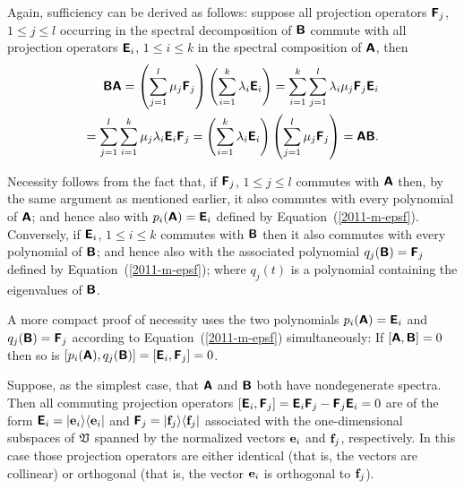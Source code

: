 {\color{OliveGreen}\bproof
Again, sufficiency can be derived as follows: suppose all projection operators $\textsf{\textbf{F}}_j$, $1\le j\le l$
occurring in the spectral decomposition of $\textsf{\textbf{B}}$
commute with all projection operators $\textsf{\textbf{E}}_i$, $1\le i\le k$
in the spectral composition of   $\textsf{\textbf{A}}$,
then
\begin{equation}
\begin{split}
 \textsf{\textbf{B}}\textsf{\textbf{A}}
=
\left(\sum_{j=1}^l \mu_j\textsf{\textbf{F}}_j\right) \left(\sum_{i=1}^k \lambda_i \textsf{\textbf{E}}_i\right)
=
\sum_{i=1}^k \sum_{j=1}^l \lambda_i \mu_j \textsf{\textbf{F}}_j\textsf{\textbf{E}}_i
\\
=
\sum_{j=1}^l \sum_{i=1}^k \mu_j \lambda_i \textsf{\textbf{E}}_i \textsf{\textbf{F}}_j
=
\left(\sum_{i=1}^k \lambda_i \textsf{\textbf{E}}_i \right)  \left(\sum_{j=1}^l \mu_j \textsf{\textbf{F}}_j\right)
=\textsf{\textbf{A}} \textsf{\textbf{B}}
.
\end{split}
\end{equation}


Necessity follows from the fact that, if $\textsf{\textbf{F}}_j$, $1\le j\le l$
commutes with  $\textsf{\textbf{A}}$
then, by the same argument as mentioned earlier,
it also commutes with every polynomial of  $\textsf{\textbf{A}}$;
and
hence also with $p_i(\textsf{\textbf{A}})=\textsf{\textbf{E}}_i$ defined by Equation~(\ref{2011-m-epsf}).
Conversely,
if $\textsf{\textbf{E}}_i$, $1\le i\le k$
commutes with  $\textsf{\textbf{B}}$
then it also commutes with every polynomial of  $\textsf{\textbf{B}}$;
and
hence also with the associated polynomial
$q_j(\textsf{\textbf{B}})=\textsf{\textbf{F}}_j$ defined by Equation~(\ref{2011-m-epsf});
where $q_j(t)$ is a polynomial containing the eigenvalues of $\textsf{\textbf{B}}$.

A more compact proof of necessity uses the two polynomials
$p_i(\textsf{\textbf{A}})=\textsf{\textbf{E}}_i$
and
$q_j(\textsf{\textbf{B}})=\textsf{\textbf{F}}_j$
according to Equation~(\ref{2011-m-epsf})
simultaneously:
If
$[\textsf{\textbf{A}},\textsf{\textbf{B}}] = 0$
then so is
$[p_i(\textsf{\textbf{A}}),q_j(\textsf{\textbf{B}})] = [\textsf{\textbf{E}}_i,\textsf{\textbf{F}}_j]= 0$.
\eproof
}




Suppose, as the simplest case, that $\textsf{\textbf{A}}$ and $\textsf{\textbf{B}}$
both have nondegenerate spectra.
Then all commuting projection operators $\left[
\textsf{\textbf{E}}_{i}
,
\textsf{\textbf{F}}_{j}
\right]=
\textsf{\textbf{E}}_{i}
\textsf{\textbf{F}}_{j}
-
\textsf{\textbf{F}}_{j}
\textsf{\textbf{E}}_{i}
=0$ are of the form
$\textsf{\textbf{E}}_{i} = \vert {\bf e}_i \rangle \langle {\bf e}_i \vert$
and
$\textsf{\textbf{F}}_{j} = \vert {\bf f}_j \rangle \langle {\bf f}_j \vert$
associated with the one-dimensional subspaces of ${\frak V}$
spanned by the normalized vectors ${\bf e}_i$  and ${\bf f}_j$,
respectively.
In this case those projection operators are either identical (that is, the vectors are collinear)
or orthogonal (that is, the vector ${\bf e}_i$ is orthogonal to ${\bf f}_j$).


